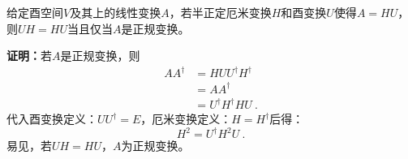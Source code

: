 \begin{theorem}{}\label{the_PoDe_1}
给定酉空间$V$及其上的线性变换$A$，若半正定厄米变换$H$和酉变换$U$使得$A=HU$，则$UH=HU$当且仅当$A$是正规变换。
\end{theorem}
\textbf{证明：}若$A$是正规变换，则
\begin{equation}
\begin{aligned}
AA^{\dagger}&=HUU^{\dagger}H^{\dagger}\\
&=AA^{\dagger}\\
&=U^{\dagger}H^{\dagger}HU~.
\end{aligned}
\end{equation}
代入酉变换定义：$UU^{\dagger}=E$，厄米变换定义：$H=H^{\dagger}$后得：
\begin{equation}\label{eq_PoDe_1}
H^2=U^{\dagger}H^2U~.
\end{equation}
易见，若$UH=HU$，$A$为正规变换。

